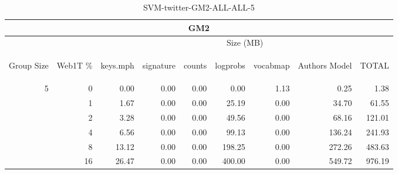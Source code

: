 \begin{center}
\begin{table}[htbp] 
 \begin{center}
\begin{tabular}{ | r | r | r | r | r | r | r | r | r |}
\hline
\multicolumn{9}{|c|}{GM2}\\
\hline
 & & \multicolumn{7}{|c|}{Size (MB)}\\ \cline{3-9}
\begin{sideways}Group Size\end{sideways} & \begin{sideways}Web1T \% \end{sideways} & \begin{sideways}keys.mph\end{sideways} & \begin{sideways}signature\end{sideways} & \begin{sideways}counts\end{sideways} & \begin{sideways}logprobs\end{sideways} & \begin{sideways}vocabmap\end{sideways} & \begin{sideways}Authors Model \end{sideways} & \begin{sideways}TOTAL\end{sideways}\\
\hline
\multirow{5}{*}{5}
 & 0 & 0.00 & 0.00 & 0.00 & 0.00 & 1.13 & 0.25 & 1.38\\ \cline{2-9}
 & 1 & 1.67 & 0.00 & 0.00 & 25.19 & 0.00 & 34.70 & 61.55\\ \cline{2-9}
 & 2 & 3.28 & 0.00 & 0.00 & 49.56 & 0.00 & 68.16 & 121.01\\ \cline{2-9}
 & 4 & 6.56 & 0.00 & 0.00 & 99.13 & 0.00 & 136.24 & 241.93\\ \cline{2-9}
 & 8 & 13.12 & 0.00 & 0.00 & 198.25 & 0.00 & 272.26 & 483.63\\ \cline{2-9}
 & 16 & 26.47 & 0.00 & 0.00 & 400.00 & 0.00 & 549.72 & 976.19\\ \cline{2-9}
\hline
\end{tabular}
\caption{SVM-twitter-GM2-ALL-ALL-5}
\label{table:SVM-twitter-GM2-ALL-ALL-5}
\end{center}
 \end{table}
\end{center}

